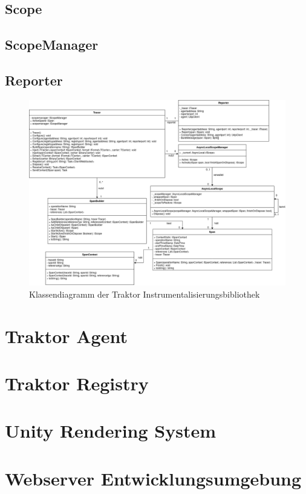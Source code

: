 \subsection{Scope}
\label{subsection:Scope}

\subsection{ScopeManager}
\label{subsection:SpanManager}

\subsection{Reporter}
\label{subsection:Reporter}
\newpage
\begin{landscape}
	\begin{figure}
		\centering
		\includegraphics[scale=0.4]{img/Implementierung/TraktorKlassendiagramm.png}
		\caption[Klassendiagramm der Traktor Instrumentalisierungsbibliothek]{Klassendiagramm der Traktor Instrumentalisierungsbibliothek}
		\label{fig:TraktorKlassendiagramm}
	\end{figure}
\end{landscape}

\section{Traktor Agent}
\label{section:Traktor Agent}
\section{Traktor Registry}
\label{section:Traktor Registry}
\section{Unity Rendering System}
\label{section:Unity Rendering System}
\section{ Webserver Entwicklungsumgebung }
\label{section:Webserver Entwicklungsumgebung}
